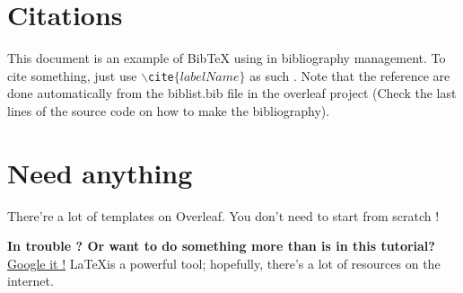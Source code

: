 \documentclass{article}
\begin{document}
\section{Citations}
This document is an example of BibTeX using in bibliography management.
 To cite something, just use \texttt{$\backslash$cite$\{labelName\}$} as such \cite{DuBoff1967}.
Note that the reference are done automatically from the biblist.bib file in the overleaf project (Check the last lines of the source code on how to make the bibliography).

\section{Need anything}
There're a lot of templates on Overleaf. You don't need to start from scratch !


\textbf{In trouble ? Or want to do something more than is in this tutorial?}
\underline{Google it !} \LaTeX is a powerful tool; hopefully, there's a lot of resources on the internet.

\nocite{*}                  %

\end{document}
